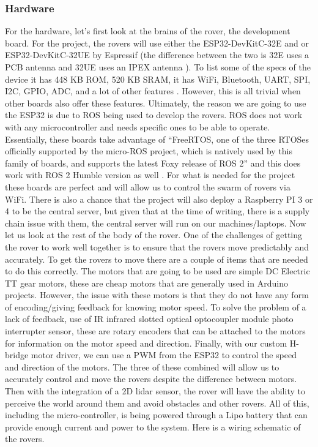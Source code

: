 \documentclass[conference]{IEEEtran}
\begin{document}
\subsubsection{Hardware}
For the hardware, let's first look at the brains of the rover, the development board. For the project, the rovers will use either the ESP32-DevKitC-32E and or ESP32-DevKitC-32UE by Espressif (the difference between the two is 32E uses a PCB antenna and 32UE uses an IPEX antenna \cite{RN203}). To list some of the specs of the device it has 448 KB ROM, 520 KB SRAM, it has WiFi, Bluetooth, UART, SPI, I2C, GPIO, ADC, and a lot of other features \cite{RN203}. However, this is all trivial when other boards also offer these features. Ultimately, the reason we are going to use the ESP32 is due to ROS being used to develop the rovers. ROS does not work with any microcontroller and needs specific ones to be able to operate. Essentially, these boards take advantage of “FreeRTOS, one of the three RTOSes officially supported by the micro-ROS project, which is natively used by this family of boards, and supports the latest Foxy release of ROS 2” \cite{RN204} and this does work with ROS 2 Humble version as well \cite{RN205}. For what is needed for the project these boards are perfect and will allow us to control the swarm of rovers via WiFi. There is also a chance that the project will also deploy a Raspberry PI 3 or 4 to be the central server, but given that at the time of writing, there is a supply chain issue with them, the central server will run on our machines/laptops. Now let us look at the rest of the body of the rover.
One of the challenges of getting the rover to work well together is to ensure that the rovers move predictably and accurately. To get the rovers to move there are a couple of items that are needed to do this correctly. The motors that are going to be used are simple DC Electric TT gear motors, these are cheap motors that are generally used in Arduino projects. However, the issue with these motors is that they do not have any form of encoding/giving feedback for knowing motor speed. To solve the problem of a lack of feedback, use of IR infrared slotted optical optocoupler module photo interrupter sensor, these are rotary encoders that can be attached to the motors for information on the motor speed and direction. Finally, with our custom H-bridge motor driver, we can use a PWM from the ESP32 to control the speed and direction of the motors. The three of these combined will allow us to accurately control and move the rovers despite the difference between motors. Then with the integration of a 2D lidar sensor, the rover will have the ability to perceive the world around them and avoid obstacles and other rovers. All of this, including the micro-controller, is being powered through a Lipo battery that can provide enough current and power to the system. Here is a wiring schematic of the rovers.
\end{document}
